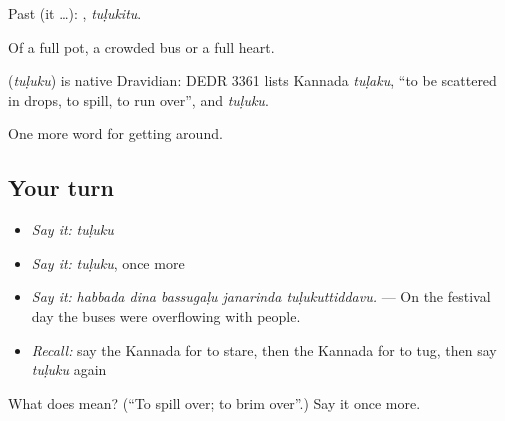 Past (it …): , \emph{tuḷukitu}.

Of a full pot, a crowded bus or a full heart.

\begin{cousinweb}
\textbf{} (\emph{tuḷuku}) is native Dravidian: DEDR 3361 lists Kannada \emph{tuḷaku}, \textquotedblleft{}to be scattered in drops, to spill, to run over\textquotedblright{}, and \emph{tuḷuku}.
\end{cousinweb}

\begin{grammarlens}[title={What you've built}]
One more word for getting around.
\end{grammarlens}

\subsection*{Your turn}
\begin{itemize}
\raggedright
  \item \emph{Say it:} \emph{tuḷuku}
  \item \emph{Say it:} \emph{tuḷuku}, once more
  \item \emph{Say it:} \emph{habbada dina bassugaḷu janarinda tuḷukuttiddavu.} — On the festival day the buses were overflowing with people.
  \item \emph{Recall:} say the Kannada for to stare, then the Kannada for to tug, then say \emph{tuḷuku} again
\end{itemize}

\begin{tcolorbox}[breakable,colback=teal!4,colframe=teal!35!black,title={Before you move on}]
What does  mean? (\textquotedblleft{}To spill over; to brim over\textquotedblright{}.) Say it once more.
\end{tcolorbox}

